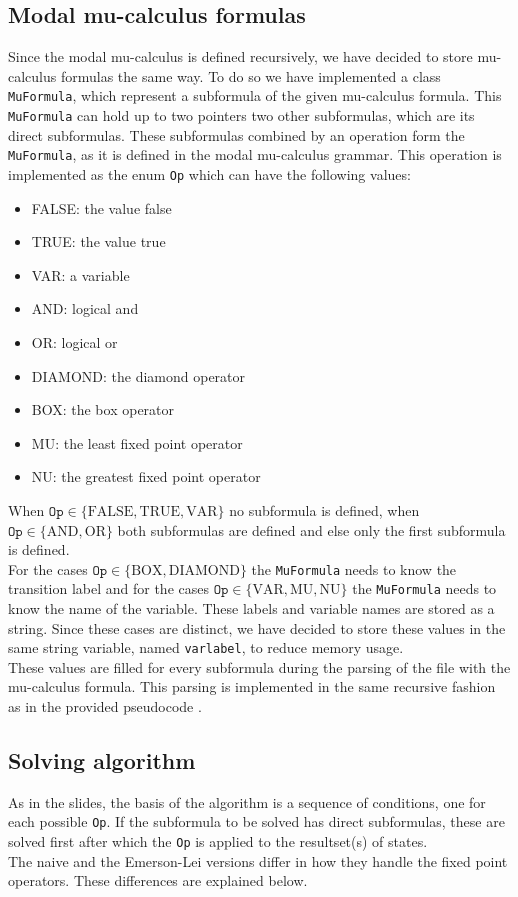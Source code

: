 \documentclass[10pt,a4paper]{article}
\begin{document}
\subsection{Modal mu-calculus formulas}
Since the modal mu-calculus is defined recursively, we have decided to store mu-calculus formulas the same way. To do so we have implemented a class \texttt{MuFormula}, which represent a subformula of the given mu-calculus formula. This \texttt{MuFormula} can hold up to two pointers two other subformulas, which are its direct subformulas. These subformulas combined by an operation form the \texttt{MuFormula}, as it is defined in the modal mu-calculus grammar. This operation is implemented as the enum \texttt{Op} which can have the following values:
\begin{itemize}
\item FALSE: the value false
\item TRUE: the value true
\item VAR: a variable
\item AND: logical and
\item OR: logical or
\item DIAMOND: the diamond operator
\item BOX: the box operator
\item MU: the least fixed point operator
\item NU: the greatest fixed point operator
\end{itemize}
When $\texttt{Op} \in \{\text{FALSE}, \text{TRUE}, \text{VAR}\}$ no subformula is defined, when $\texttt{Op} \in \{\text{AND}, \text{OR}\}$ both subformulas are defined and else only the first subformula is defined.\\
For the cases $\texttt{Op} \in \{\text{BOX}, \text{DIAMOND}\}$ the \texttt{MuFormula} needs to know the transition label and for the cases $\texttt{Op} \in \{\text{VAR}, \text{MU}, \text{NU}\}$ the \texttt{MuFormula} needs to know the name of the variable. These labels and variable names are stored as a string. Since these cases are distinct, we have decided to store these values in the same string variable, named \texttt{varlabel}, to reduce memory usage.\\
These values are filled for every subformula during the parsing of the file with the mu-calculus formula. This parsing is implemented in the same recursive fashion as in the provided pseudocode \cite{muparse}.


\subsection{Solving algorithm}
As in the slides, the basis of the algorithm is a sequence of conditions, one for each possible \texttt{Op}. If the subformula to be solved has direct subformulas, these are solved first after which the \texttt{Op} is applied to the resultset(s) of states.\\
The naive and the Emerson-Lei versions differ in how they handle the fixed point operators. These differences are explained below.
\end{document}
